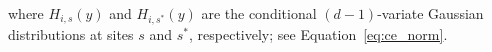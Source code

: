 \documentclass[12pt,compact]{article}
\newcommand{\JSGa}{\mathop{\mathrm{JS}^{\mathrm{G}_{\lambda}}}\nolimits}
\newcommand{\cJSGa}[1]{\mathop{\mathrm{cJS}_{i, #1}^{\mathrm{G}_{\lambda}}}\nolimits}
\newcommand\numberthis{\addtocounter{equation}{1}\tag{\theequation}}
\newcommand{\mvmean}[1]{\symbf{\alpha}_{\mid i, #1} y + y^{\symbf{\beta}_{\mid i, #1}} \symbf{\mu}_{\mid i, #1}}
\newcommand{\mvcov}[1]{\left(y^{\symbf{\beta}_{\mid i, #1}}\right)^{\mathrm{T}} \Sigma_{\mid i, #1} y^{\symbf{\beta}_{\mid i, #1}}}
\begin{document}
where $H_{i, s}(y)$ and $H_{i, s^*}(y)$ are the conditional $(d-1)$-variate Gaussian distributions at sites $s$ and $s^*$, respectively; see Equation~\eqref{eq:ce_norm}.
\end{document}
